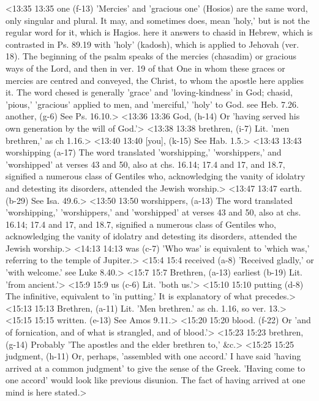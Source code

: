 <13:35 13:35  one (f-13)  'Mercies' and 'gracious one' (Hosios) are the same word,  only singular and plural. It may, and sometimes does, mean  'holy,' but is not the regular word for it, which is Hagios.  here it answers to chasid in Hebrew, which is contrasted in  Ps. 89.19 with 'holy' (kadosh), which is applied to Jehovah  (ver. 18). The beginning of the psalm speaks of the mercies  (chasadim) or gracious ways of the Lord, and then in ver. 19  of that One in whom these graces or mercies are centred and  conveyed, the Christ, to whom the apostle here applies it. The  word chesed is generally 'grace' and 'loving-kindness' in  God; chasid, 'pious,' 'gracious' applied to men, and  'merciful,' 'holy' to God. see Heb. 7.26.
  another, (g-6)  See Ps. 16.10.>
<13:36 13:36  God, (h-14)  Or 'having served his own generation by the will of God.'>
<13:38 13:38  brethren, (i-7)  Lit. 'men brethren,' as ch 1.16.>
<13:40 13:40  [you], (k-15)  See Hab. 1.5.>
<13:43 13:43  worshipping (a-17)  The word translated 'worshipping,' 'worshippers,' and  'worshipped' at verses 43 and 50, also at chs. 16.14; 17.4 and  17, and 18.7, signified a numerous class of Gentiles who,  acknowledging the vanity of idolatry and detesting its  disorders, attended the Jewish worship.>
<13:47 13:47  earth. (b-29)  See Isa. 49.6.>
<13:50 13:50  worshippers, (a-13)  The word translated 'worshipping,' 'worshippers,' and  'worshipped' at verses 43 and 50, also at chs. 16.14; 17.4 and  17, and 18.7, signified a numerous class of Gentiles who,  acknowledging the vanity of idolatry and detesting its  disorders, attended the Jewish worship.>
<14:13 14:13  was (c-7)  'Who was' is equivalent to 'which was,' referring to the  temple of Jupiter.>
<15:4 15:4  received (a-8)  'Received gladly,' or 'with welcome.' see Luke 8.40.>
<15:7 15:7  Brethren, (a-13)  earliest (b-19)  Lit. 'from ancient.'>
<15:9 15:9  us (c-6)  Lit. 'both us.'>
<15:10 15:10  putting (d-8)  The infinitive, equivalent to 'in putting.' It is explanatory  of what precedes.>
<15:13 15:13  Brethren, (a-11)  Lit. 'Men brethren.' as ch. 1.16, so ver. 13.>
<15:15 15:15  written. (e-13)  See Amos 9.11.>
<15:20 15:20  blood. (f-22)  Or 'and of fornication, and of what is strangled, and of  blood.'>
<15:23 15:23  brethren, (g-14)  Probably 'The apostles and the elder brethren to,' &c.>
<15:25 15:25  judgment, (h-11)  Or, perhaps, 'assembled with one accord.' I have said 'having  arrived at a common judgment' to give the sense of the Greek.  'Having come to one accord' would look like previous disunion.  The fact of having arrived at one mind is here stated.>
